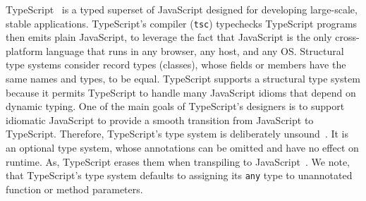 \documentclass[acmsmall,nonacm]{acmart}\settopmatter{printfolios=true,printccs=false,printacmref=false}
\begin{document}
TypeScript~\citep{typescript} is a typed superset of
JavaScript designed for developing large-scale, stable applications.
TypeScript's compiler (\lstinline+tsc+) typechecks TypeScript programs then emits plain JavaScript,
to leverage the fact that JavaScript is the only cross-platform
language that runs in any browser, any host, and any OS.
Structural type systems consider record types (classes), whose fields or members have the same names and types, to be equal.
TypeScript supports a
structural type system because it permits TypeScript to handle many JavaScript idioms that depend on dynamic typing.
One of the main goals of TypeScript's designers is to support idiomatic
JavaScript to
provide a smooth transition from JavaScript to TypeScript.
%
Therefore, TypeScript's type system is deliberately
unsound~\citep{understandtypescript}.  It is an optional type system, whose
annotations can be omitted and have no effect on runtime. As, TypeScript erases 
them when transpiling to JavaScript~\citep{understandtypescript}.
We note, that TypeScript's type system defaults to assigning its \texttt{\small{any}} type to unannotated function or method parameters.  


\end{document}
